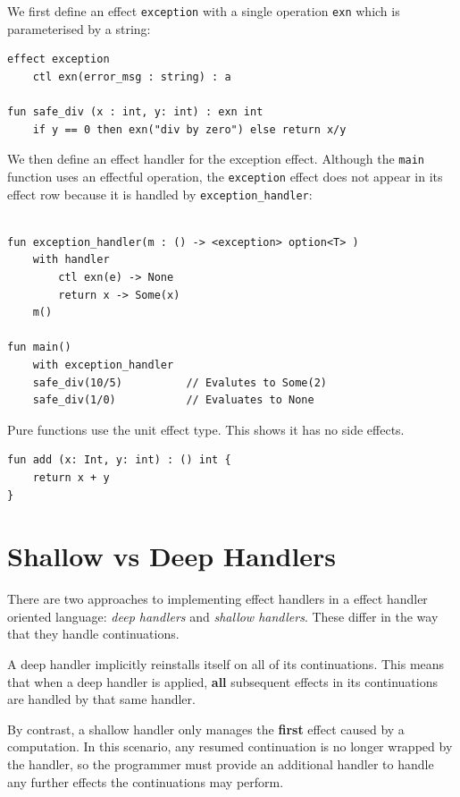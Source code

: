 \documentclass[logo,bsc,singlespacing,parskip]{infthesis}
\begin{document}
We first define an effect \lstinline{exception} with a single operation \lstinline{exn} which is parameterised by a string: 
\begin{lstlisting}
effect exception
    ctl exn(error_msg : string) : a 

fun safe_div (x : int, y: int) : exn int
    if y == 0 then exn("div by zero") else return x/y
\end{lstlisting}

We then define an effect handler for the exception effect. Although the \lstinline{main} function uses an effectful operation, the \lstinline{exception} effect does not appear in its effect row because it is handled by \lstinline{exception_handler}:

\begin{lstlisting}

fun exception_handler(m : () -> <exception> option<T> )
    with handler
        ctl exn(e) -> None
        return x -> Some(x)
    m()

fun main() 
    with exception_handler
    safe_div(10/5)          // Evalutes to Some(2)
    safe_div(1/0)           // Evaluates to None
\end{lstlisting}


Pure functions use the unit effect type. This shows it has no side effects. 

\begin{lstlisting}
fun add (x: Int, y: int) : () int {
	return x + y
}
\end{lstlisting}

\section{Shallow vs Deep Handlers}
There are two approaches to implementing effect handlers in a effect handler oriented language: \textit{deep handlers} and \textit{shallow handlers}. These differ in the way that they handle continuations.

A deep handler  implicitly reinstalls itself on all of its continuations. This means that when a deep handler is applied, \textbf{all} subsequent effects in its continuations are handled by that same handler\cite{hillerstrom_foundations_nodate}. 

By contrast, a shallow handler \cite{ryu_shallow_2018} only manages the \textbf{first} effect caused by a computation. In this scenario, any resumed continuation is no longer wrapped by the handler, so the programmer must provide an additional handler to handle any further effects the continuations may perform.
\end{document}
